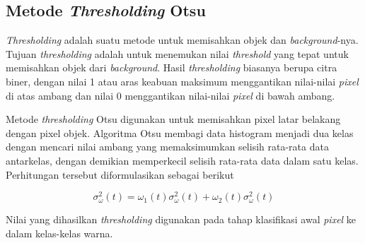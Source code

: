 \documentclass[laporan.tex]{subfiles}
\begin{document}
\subsection{Metode \emph{Thresholding} Otsu}

\emph{Thresholding} adalah suatu metode untuk memisahkan objek dan \emph{background}-nya. Tujuan \emph{thresholding} adalah untuk menemukan nilai \emph{threshold} yang tepat untuk memisahkan objek dari \emph{background}. Hasil \emph{thresholding} biasanya berupa citra biner, dengan nilai 1 atau aras keabuan maksimum menggantikan nilai-nilai \emph{pixel} di atas ambang dan nilai 0 menggantikan nilai-nilai \emph{pixel} di bawah ambang.

Metode \emph{thresholding} Otsu digunakan untuk memisahkan pixel latar belakang dengan pixel objek. Algoritma Otsu membagi data histogram menjadi dua kelas dengan mencari nilai ambang yang memaksimumkan selisih rata-rata data antarkelas, dengan demikian memperkecil selisih rata-rata data dalam satu kelas. Perhitungan tersebut diformulasikan sebagai berikut

\begin{equation}
	\sigma_{\omega}^2 (t) = \omega_1 (t) \sigma_{\omega}^2 (t) + \omega_2 (t) \sigma_{\omega}^2 (t)
\end{equation}

Nilai yang dihasilkan \emph{thresholding} digunakan pada tahap klasifikasi awal \emph{pixel} ke dalam kelas-kelas warna.
\end{document}
